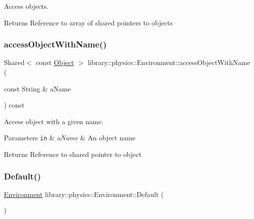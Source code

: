 Access objects. 

\begin{DoxyReturn}{Returns}
Reference to array of shared pointers to objects 
\end{DoxyReturn}
\mbox{\label{classlibrary_1_1physics_1_1_environment_adb18bd17dfbffa181d7e0d868c2647a0}} 
\subsubsection{\texorpdfstring{access\+Object\+With\+Name()}{accessObjectWithName()}}
{\footnotesize\ttfamily Shared$<$ const \hyperlink{classlibrary_1_1physics_1_1env_1_1_object}{Object} $>$ library\+::physics\+::\+Environment\+::access\+Object\+With\+Name (\begin{DoxyParamCaption}\item[{const String \&}]{a\+Name }\end{DoxyParamCaption}) const}



Access object with a given name. 


\begin{DoxyParams}[1]{Parameters}
\mbox{\tt in}  & {\em a\+Name} & An object name \\
\hline
\end{DoxyParams}
\begin{DoxyReturn}{Returns}
Reference to shared pointer to object 
\end{DoxyReturn}
\mbox{\label{classlibrary_1_1physics_1_1_environment_a7fcc57999bfb9c0c7e70b7cc783e30c8}} 
\subsubsection{\texorpdfstring{Default()}{Default()}}
{\footnotesize\ttfamily \hyperlink{classlibrary_1_1physics_1_1_environment}{Environment} library\+::physics\+::\+Environment\+::\+Default (\begin{DoxyParamCaption}{ }\end{DoxyParamCaption})\hspace{0.3cm}{\ttfamily [static]}}



